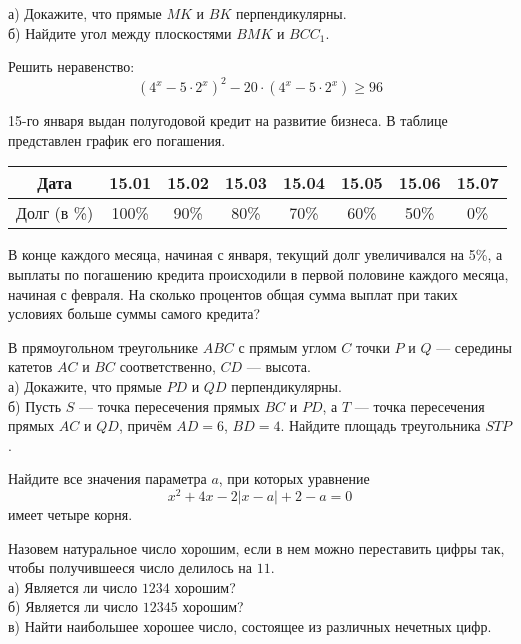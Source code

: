 \begin{training}[1]
\begin{listofex}[resume]
		а) Докажите, что прямые \( MK \) и \( BK \) перпендикулярны.\\
		б) Найдите угол между плоскостями \( BMK \) и \( BCC_1 \).
		\item Решить неравенство:
		\[ (4^x-5\cdot2^x)^2-20\cdot(4^x-5\cdot2^x)\ge96 \]
		\item 15-го января выдан полугодовой кредит на развитие бизнеса. В таблице
		представлен график его погашения.
		\begin{center}
			\begin{tabular}{|c|c|c|c|c|c|c|c|}
				\hline
				Дата & 15.01 & 15.02 & 15.03 & 15.04 & 15.05 & 15.06 & 15.07 \\
				\hline
				Долг (в \%) & 100\% & 90\% & 80\% & 70\% & 60\% & 50\% & 0\% \\
				\hline
			\end{tabular}
		\end{center}
		В конце каждого месяца, начиная с января, текущий долг увеличивался
		на 5\%, а выплаты по погашению кредита происходили в первой половине
		каждого месяца, начиная с февраля. На сколько процентов общая сумма
		выплат при таких условиях больше суммы самого кредита?
		\item В прямоугольном треугольнике \( ABC \) с прямым углом \( C \)
		точки \( P \) и \( Q \) --- середины катетов \( AC \) и \( BC \) соответственно, \( CD \) --- высота.\\
		а) Докажите, что прямые \( PD \) и \( QD \) перпендикулярны.\\
		б) Пусть \( S \) --- точка пересечения прямых \( BC \) и \( PD \),
		а \( T \) --- точка пересечения прямых \( AC \) и \( QD \),
		причём \( AD = 6 \), \( BD = 4 \).
		Найдите площадь треугольника \( STP \).
		\item Найдите все значения параметра \( a \), при которых уравнение
		\[ x^2+4x-2|x-a|+2-a=0 \]
		имеет четыре корня.
		\item Назовем натуральное число хорошим, если в нем можно переставить
		цифры так, чтобы получившееся число делилось на \( 11 \).\\
		а) Является ли число \( 1234 \) хорошим?\\
		б) Является ли число \( 12345 \) хорошим?\\
		в) Найти наибольшее хорошее число, состоящее из различных нечетных цифр.
	\end{listofex}
\end{training}


